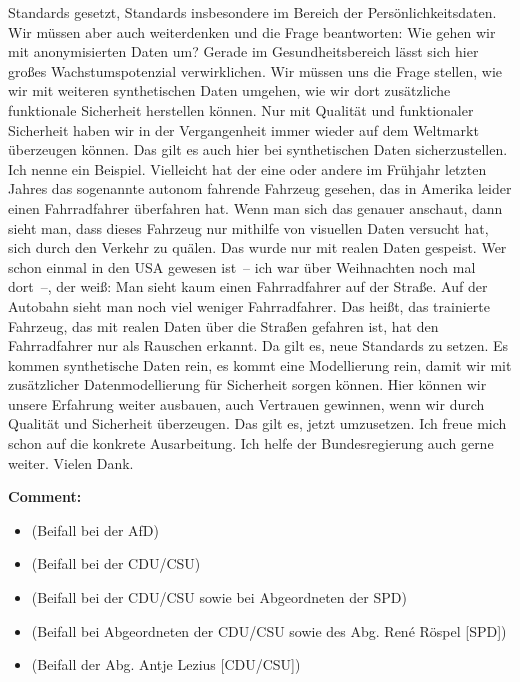 \documentclass{article}
\begin{document}
Standards gesetzt, Standards insbesondere im Bereich der Persönlichkeitsdaten. Wir müssen aber auch weiterdenken und die Frage beantworten: Wie gehen wir mit anonymisierten Daten um? Gerade im Gesundheitsbereich lässt sich hier großes Wachstumspotenzial verwirklichen. Wir müssen uns die Frage stellen, wie wir mit weiteren synthetischen Daten umgehen, wie wir dort zusätzliche funktionale Sicherheit herstellen können. Nur mit Qualität und funktionaler Sicherheit haben wir in der Vergangenheit immer wieder auf dem Weltmarkt überzeugen können. Das gilt es auch hier bei synthetischen Daten sicherzustellen.  Ich nenne ein Beispiel. Vielleicht hat der eine oder andere im Frühjahr letzten Jahres das sogenannte autonom fahrende Fahrzeug gesehen, das in Amerika leider einen Fahrradfahrer überfahren hat. Wenn man sich das genauer anschaut, dann sieht man, dass dieses Fahrzeug nur mithilfe von visuellen Daten versucht hat, sich durch den Verkehr zu quälen. Das wurde nur mit realen Daten gespeist. Wer schon einmal in den USA gewesen ist – ich war über Weihnachten noch mal dort –, der weiß: Man sieht kaum einen Fahrradfahrer auf der Straße. Auf der Autobahn sieht man noch viel weniger Fahrradfahrer. Das heißt, das trainierte Fahrzeug, das mit realen Daten über die Straßen gefahren ist, hat den Fahrradfahrer nur als Rauschen erkannt. Da gilt es, neue Standards zu setzen. Es kommen synthetische Daten rein, es kommt eine Modellierung rein, damit wir mit zusätzlicher Datenmodellierung für Sicherheit sorgen können. Hier können wir unsere Erfahrung weiter ausbauen, auch Vertrauen gewinnen, wenn wir durch Qualität und Sicherheit überzeugen. Das gilt es, jetzt umzusetzen. Ich freue mich schon auf die konkrete Ausarbeitung. Ich helfe der Bundesregierung auch gerne weiter. Vielen Dank.  

\noindent\textbf{Comment:}
\begin{itemize}
    \setlength\itemsep{-3pt}
    \item (Beifall bei der AfD)
    \setlength\itemsep{-3pt}
    \item (Beifall bei der CDU/CSU)
    \setlength\itemsep{-3pt}
    \item (Beifall bei der CDU/CSU sowie bei Abgeordneten der SPD)
    \setlength\itemsep{-3pt}
    \item (Beifall bei Abgeordneten der CDU/CSU sowie des Abg. René Röspel [SPD])
    \setlength\itemsep{-3pt}
    \item (Beifall der Abg. Antje Lezius [CDU/CSU])
\end{itemize}
\end{document}

